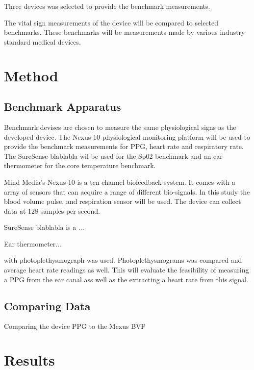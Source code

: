 Three devices was selected to provide the benchmark measurements. 


The vital sign measurements of the device will be compared to selected benchmarks. These benchmarks will be measurements made by various industry standard medical devices.





\section{Method}
\subsection{Benchmark Apparatus}
Benchmark devises are chosen to measure the same physiological signs as the developed device. The Nexus-10 physiological monitoring platform will be used to provide the benchmark measurements for PPG, heart rate and respiratory rate. The SureSense blablabla wil be used for the Sp02 benchmark and an ear thermometer for the core temperature benchmark.

Mind Media's Nexus-10 is a ten channel biofeedback system. It comes with a array of sensors that can acquire a range of different bio-signals. In this study the blood volume pulse, and respiration sensor will be used. The device can collect data at 128 samples per second. 

SureSense blablabla is a ...

Ear thermometer...

with photoplethysmograph was used. Photoplethysmograms was compared and average heart rate readings as well. This will evaluate the feasibility of measuring a PPG from the ear canal ass well as the extracting a heart rate from this signal.

\subsection{Comparing Data}
Comparing the device PPG to the Mexus BVP


\section{Results}


